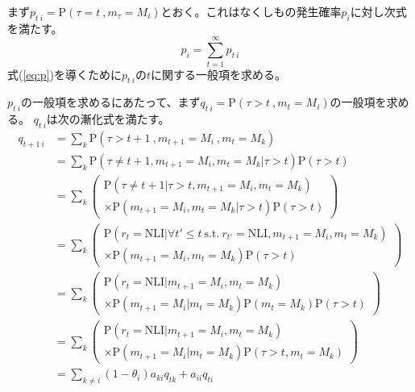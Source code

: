 \documentclass{jarticle}
\numberwithin{equation}{section}
\numberwithin{table}{section}
\theoremstyle{plain}
\begin{document}
まず$ p_{t\ i} = \mathrm{P}(\tau = t\ , m_\tau = M_i) $とおく。これはなくしもの発生確率$p_i$に対し次式を満たす。
\begin{equation} \label{eq:pi=sum_pti}
    p_i = \sum_{t=1}^{\infty}p_{t\ i}
\end{equation}
式(\ref{eq:p})を導くために$ p_{t\ i} $の$t$に関する一般項を求める。

$ p_{t\ i} $の一般項を求めるにあたって、まず$ q_{t\ i} = \mathrm{P}(\tau > t\ , m_t=M_i) $の一般項を求める。
$ q_{t\ i} $は次の漸化式を満たす。
\begin{align}
    q_{t+1\ i} & = \! \sum_{k} \mathrm{P}(\tau \! > \! t + 1\ , m_{t+1} \! = \! M_i\ , m_t \! = \! M_k) \nonumber\\
    & = \! \sum_{k} \mathrm{P}(\tau \! \ne \! t + 1 , m_{t+1} \! = \! M_i , m_t \! = \! M_k | \tau \! > \! t) \mathrm{P}(\tau \! > \! t) \nonumber\\
    & = \! \sum_{k} \left(
        \begin{array}{l}
            \mathrm{P}(\tau \! \ne \! t + 1 | \tau \! > \! t , m_{t+1} \! = \! M_i , m_t \! = \! M_k) \\
            \times \mathrm{P}(m_{t+1} \! = \! M_i , m_t \! = \! M_k | \tau \! > \! t) \mathrm{P}(\tau \! > \! t)
        \end{array}
     \right) \nonumber\\
    & = \! \sum_{k} \left(
        \begin{array}{l}
            \mathrm{P}(r_t \! = \! \mathrm{NLI} | \forall t' \! \le \! t \ \mathrm{s.t.}\ r_{t'}\! =\!\mathrm{NLI} , m_{t+1} \! = \! M_i , m_t \! = \! M_k) \\
            \times \mathrm{P}(m_{t+1} \! = \! M_i , m_t \! = \! M_k) \mathrm{P}(\tau \! > \! t)
        \end{array}
    \right) \nonumber\\
    & = \! \sum_{k} \left(
        \begin{array}{l}
            \mathrm{P}(r_t \! = \! \mathrm{NLI} | m_{t+1} \! = \! M_i , m_t \! = \! M_k) \\
            \times \mathrm{P}(m_{t+1} \! = \! M_i | m_t \! = \! M_k) \mathrm{P}(m_t \! = \! M_k) \mathrm{P}(\tau \! > \! t)
        \end{array}
    \right) \nonumber\\
    & = \! \sum_{k} \left(
        \begin{array}{l}
            \mathrm{P}(r_t \! = \! \mathrm{NLI} | m_{t+1} \! = \! M_i , m_t \! = \! M_k) \\
            \times \mathrm{P}(m_{t+1} \! = \! M_i | m_t \! = \! M_k) \mathrm{P}(\tau \! > \! t , m_t \! = \! M_k)
        \end{array}
    \right) \nonumber\\
    & = \! \sum_{k \ne i} (1 - \theta_i) a_{k i} q_{t k} + a_{i i} q_{t i} \label{eq:qti_rec}
\end{align}
\end{document}
